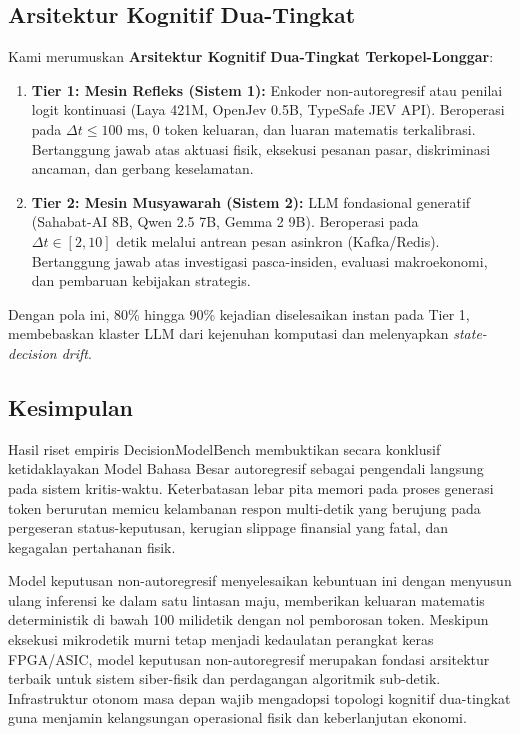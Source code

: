 \documentclass[journal,compsoc]{IEEEtran}
\begin{document}
\subsection{Arsitektur Kognitif Dua-Tingkat}
Kami merumuskan \textbf{Arsitektur Kognitif Dua-Tingkat Terkopel-Longgar}:
\begin{enumerate}
    \item \textbf{Tier 1: Mesin Refleks (Sistem 1):} Enkoder non-autoregresif atau penilai logit kontinuasi (Laya 421M, OpenJev 0.5B, TypeSafe JEV API). Beroperasi pada $\Delta t \le 100 \text{ ms}$, 0 token keluaran, dan luaran matematis terkalibrasi. Bertanggung jawab atas aktuasi fisik, eksekusi pesanan pasar, diskriminasi ancaman, dan gerbang keselamatan.
    \item \textbf{Tier 2: Mesin Musyawarah (Sistem 2):} LLM fondasional generatif (Sahabat-AI 8B, Qwen 2.5 7B, Gemma 2 9B). Beroperasi pada $\Delta t \in [2, 10] \text{ detik}$ melalui antrean pesan asinkron (Kafka/Redis). Bertanggung jawab atas investigasi pasca-insiden, evaluasi makroekonomi, dan pembaruan kebijakan strategis.
\end{enumerate}
Dengan pola ini, 80\% hingga 90\% kejadian diselesaikan instan pada Tier 1, membebaskan klaster LLM dari kejenuhan komputasi dan melenyapkan \textit{state-decision drift}.

\subsection{Kesimpulan}
Hasil riset empiris DecisionModelBench membuktikan secara konklusif ketidaklayakan Model Bahasa Besar autoregresif sebagai pengendali langsung pada sistem kritis-waktu. Keterbatasan lebar pita memori pada proses generasi token berurutan memicu kelambanan respon multi-detik yang berujung pada pergeseran status-keputusan, kerugian slippage finansial yang fatal, dan kegagalan pertahanan fisik.

Model keputusan non-autoregresif menyelesaikan kebuntuan ini dengan menyusun ulang inferensi ke dalam satu lintasan maju, memberikan keluaran matematis deterministik di bawah 100 milidetik dengan nol pemborosan token. Meskipun eksekusi mikrodetik murni tetap menjadi kedaulatan perangkat keras FPGA/ASIC, model keputusan non-autoregresif merupakan fondasi arsitektur terbaik untuk sistem siber-fisik dan perdagangan algoritmik sub-detik. Infrastruktur otonom masa depan wajib mengadopsi topologi kognitif dua-tingkat guna menjamin kelangsungan operasional fisik dan keberlanjutan ekonomi.
\end{document}

